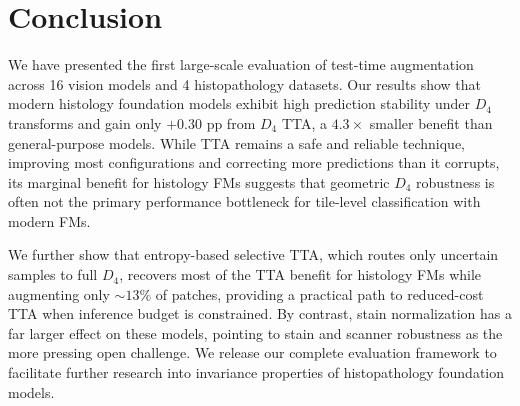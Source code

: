 \documentclass{melba}
\begin{document}
\section{Conclusion}
\label{sec:conclusion}

We have presented the first large-scale evaluation of test-time augmentation across 16 vision models and 4 histopathology datasets. Our results show that modern histology foundation models exhibit high prediction stability under $D_4$ transforms and gain only $+0.30$ pp from $D_4$ TTA, a $4.3\times$ smaller benefit than general-purpose models. While TTA remains a safe and reliable technique, improving most configurations and correcting more predictions than it corrupts, its marginal benefit for histology FMs suggests that geometric $D_4$ robustness is often not the primary performance bottleneck for tile-level classification with modern FMs.

We further show that entropy-based selective TTA, which routes only uncertain samples to full $D_4$, recovers most of the TTA benefit for histology FMs while augmenting only ${\sim}13\%$ of patches, providing a practical path to reduced-cost TTA when inference budget is constrained. By contrast, stain normalization has a far larger effect on these models, pointing to stain and scanner robustness as the more pressing open challenge. We release our complete evaluation framework to facilitate further research into invariance properties of histopathology foundation models.




\end{document}

